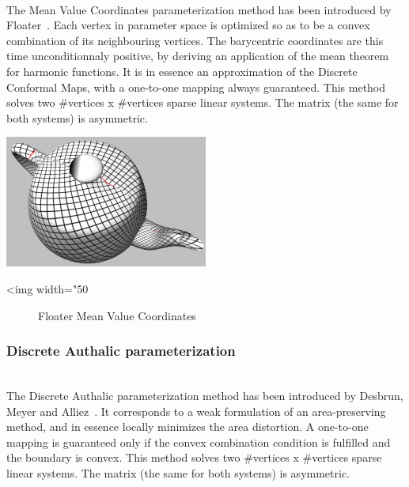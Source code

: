   \\

The Mean Value Coordinates parameterization method has been introduced
by Floater~\cite{cgal:f-mvc-03}. Each vertex in parameter space is
optimized so as to be a convex combination of its neighbouring
vertices. The barycentric coordinates are this time unconditionnaly
positive, by deriving an application of the mean theorem for harmonic
functions. It is in essence an approximation of the Discrete Conformal
Maps, with a one-to-one mapping always guaranteed. This method solves
two \#vertices x \#vertices sparse linear systems. The matrix (the
same for both systems) is asymmetric.

\begin{center}
    \label{parameterization-fig-floater}
    \begin{ccTexOnly}
        \includegraphics[width=0.5\textwidth]{Parameterization/floater} %
    \end{ccTexOnly}
    \begin{ccHtmlOnly}
        <img width="50%
    \end{ccHtmlOnly}
    \begin{figure}[h]
        \caption{Floater Mean Value Coordinates}
    \end{figure}
\end{center}


\subsubsection{Discrete Authalic parameterization}

  \\

The Discrete Authalic parameterization method has been introduced by
Desbrun, Meyer and Alliez~\cite{cgal:dma-ipsm-02}.  It corresponds to
a weak formulation of an area-preserving method, and in essence
locally minimizes the area distortion. A one-to-one mapping is
guaranteed only if the convex combination condition is fulfilled and
the boundary is convex.  This method solves two
\#vertices x \#vertices sparse linear systems. The matrix (the same
for both systems) is asymmetric.

